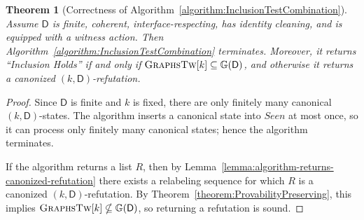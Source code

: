 \documentclass[11pt,a4paper]{article}
\newtheorem{theorem}{Theorem}
\newcommand{\treewidthvalue}{k}
\newcommand{\dpcoregraphproperty}[1]{\mathbb{G}(#1)}
\newcommand{\dpcore}{\mathsf{D}}
\newcommand{\allgraphstreewidth}[1]{\textsc{GraphsTw}[#1]}
\begin{document}
	\begin{theorem}[Correctness of Algorithm~\ref{algorithm:InclusionTestCombination}]
	\label{theorem:algorithm-correctness}
	Assume $\dpcore$ is finite, coherent, interface-respecting, has identity cleaning, and is equipped with a witness action.
	Then Algorithm~\ref{algorithm:InclusionTestCombination} terminates.
	Moreover, it returns ``Inclusion Holds'' if and only if $\allgraphstreewidth{\treewidthvalue}\subseteq \dpcoregraphproperty{\dpcore}$, and otherwise it returns a canonized $(\treewidthvalue,\dpcore)$-refutation.
	\end{theorem}
		\begin{proof}
		Since $\dpcore$ is finite and $\treewidthvalue$ is fixed, there are only finitely many canonical $(\treewidthvalue,\dpcore)$-states.
		The algorithm inserts a canonical state into $Seen$ at most once, so it can process only finitely many canonical states; hence the algorithm terminates.

	If the algorithm returns a list $R$, then by Lemma~\ref{lemma:algorithm-returns-canonized-refutation} there exists a relabeling sequence for which $R$ is a canonized $(\treewidthvalue,\dpcore)$-refutation.
	By Theorem~\ref{theorem:ProvabilityPreserving}, this implies $\allgraphstreewidth{\treewidthvalue}\nsubseteq \dpcoregraphproperty{\dpcore}$, so returning a refutation is sound.


\end{proof}
\end{document}
